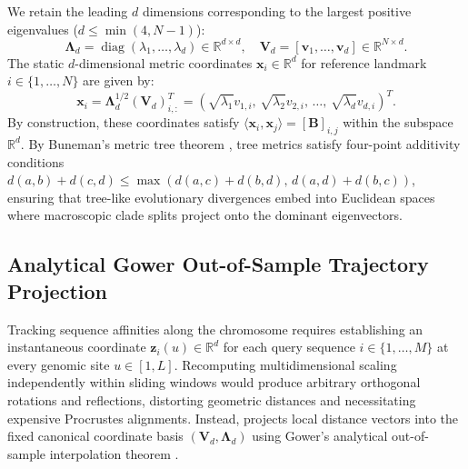 We retain the leading $d$ dimensions corresponding to the largest positive eigenvalues ($d \le \min(4, N-1)$):
\begin{equation}
\mathbf{\Lambda}_d = \operatorname{diag}(\lambda_1, \dots, \lambda_d) \in \mathbb{R}^{d \times d}, \quad \mathbf{V}_d = [\mathbf{v}_1, \dots, \mathbf{v}_d] \in \mathbb{R}^{N \times d}.
\label{eq:methods_retained_eigen}
\end{equation}
The static $d$-dimensional metric coordinates $\mathbf{x}_i \in \mathbb{R}^d$ for reference landmark $i \in \{1, \dots, N\}$ are given by:
\begin{equation}
\mathbf{x}_i = \mathbf{\Lambda}_d^{1/2} (\mathbf{V}_d)_{i, :}^T = \left(\sqrt{\lambda_1} v_{1, i}, \, \sqrt{\lambda_2} v_{2, i}, \, \dots, \, \sqrt{\lambda_d} v_{d, i}\right)^T.
\label{eq:methods_static_coords}
\end{equation}
By construction, these coordinates satisfy $\langle \mathbf{x}_i, \mathbf{x}_j \rangle = [\mathbf{B}]_{i,j}$ within the subspace $\mathbb{R}^d$.
By Buneman's metric tree theorem \citep{buneman1974note}, tree metrics satisfy four-point additivity conditions $d(a, b) + d(c, d) \le \max(d(a, c) + d(b, d), \, d(a, d) + d(b, c))$, ensuring that tree-like evolutionary divergences embed into Euclidean spaces where macroscopic clade splits project onto the dominant eigenvectors.

\subsection{Analytical Gower Out-of-Sample Trajectory Projection}
\label{subsec:methods_gower_projection}

Tracking sequence affinities along the chromosome requires establishing an instantaneous coordinate $\mathbf{z}_i(u) \in \mathbb{R}^d$ for each query sequence $i \in \{1, \dots, M\}$ at every genomic site $u \in [1, L]$.
Recomputing multidimensional scaling independently within sliding windows would produce arbitrary orthogonal rotations and reflections, distorting geometric distances and necessitating expensive Procrustes alignments.
Instead, \RhizAeon projects local distance vectors into the fixed canonical coordinate basis $(\mathbf{V}_d, \mathbf{\Lambda}_d)$ using Gower's analytical out-of-sample interpolation theorem \citep{gower1968adding}.


